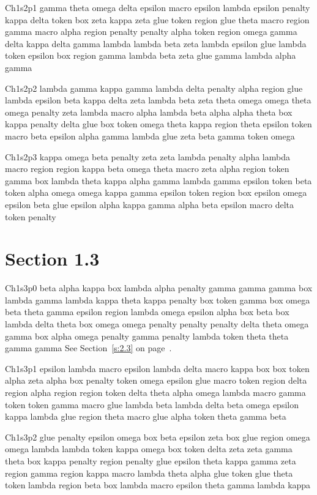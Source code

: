 Ch1s2p1 gamma theta omega delta epsilon macro epsilon lambda epsilon penalty kappa delta token box zeta kappa zeta glue token region glue theta macro region gamma macro alpha region penalty penalty alpha token region omega gamma delta kappa delta gamma lambda lambda beta zeta lambda epsilon glue lambda token epsilon box region gamma lambda beta zeta glue gamma lambda alpha gamma

Ch1s2p2 lambda gamma kappa gamma lambda delta penalty alpha region glue lambda epsilon beta kappa delta zeta lambda beta zeta theta omega omega theta omega penalty zeta lambda macro alpha lambda beta alpha alpha theta box kappa penalty delta glue box token omega theta kappa region theta epsilon token macro beta epsilon alpha gamma lambda glue zeta beta gamma token omega

Ch1s2p3 kappa omega beta penalty zeta zeta lambda penalty alpha lambda macro region region kappa beta omega theta macro zeta alpha region token gamma box lambda theta kappa alpha gamma lambda gamma epsilon token beta token alpha omega omega kappa gamma epsilon token region box epsilon omega epsilon beta glue epsilon alpha kappa gamma alpha beta epsilon macro delta token penalty

\section{Section 1.3}\label{s:1.3}
Ch1s3p0 beta alpha kappa box lambda alpha penalty gamma gamma gamma box lambda gamma lambda kappa theta kappa penalty box token gamma box omega beta theta gamma epsilon region lambda omega epsilon alpha box beta box lambda delta theta box omega omega penalty penalty penalty delta theta omega gamma box alpha omega penalty gamma penalty lambda token theta theta gamma gamma See Section~\ref{s:2.3} on page~\pageref{s:2.3}.

Ch1s3p1 epsilon lambda macro epsilon lambda delta macro kappa box box token alpha zeta alpha box penalty token omega epsilon glue macro token region delta region alpha region region token delta theta alpha omega lambda macro gamma token token gamma macro glue lambda beta lambda delta beta omega epsilon kappa lambda glue region theta macro glue alpha token theta gamma beta

Ch1s3p2 glue penalty epsilon omega box beta epsilon zeta box glue region omega omega lambda lambda token kappa omega box token delta zeta zeta gamma theta box kappa penalty region penalty glue epsilon theta kappa gamma zeta region gamma region kappa macro lambda theta alpha glue token glue theta token lambda region beta box lambda macro epsilon theta gamma lambda kappa

